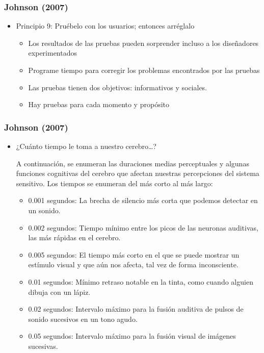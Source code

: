 \documentclass[11pt]{beamer}
\begin{document}
\begin{frame}
\frametitle{Johnson (2007)}
\begin{itemize}
\color{red}
\item Principio 9: Pruébelo con los usuarios; entonces arréglalo
    \par
    \justify
    \color{black}
    \begin{itemize}
    \item Los resultados de las pruebas pueden sorprender incluso a los         diseñadores experimentados 
	\item Programe tiempo para corregir los problemas encontrados por las pruebas
	\item Las pruebas tienen dos objetivos: informativos y sociales.
	\item Hay pruebas para cada momento y propósito
    \end{itemize}
\end{itemize}
\end{frame}

\begin{frame}
\frametitle{Johnson (2007)}
\begin{itemize}
\color{red}
\item ¿Cuánto tiempo le toma a nuestro cerebro…?
\par
\color{black}
A continuación, se enumeran las duraciones medias perceptuales y algunas funciones cognitivas del cerebro que afectan nuestras percepciones del sistema sensitivo. Los tiempos se enumeran del más corto al más largo:
    \par
    \justify
    \color{black}
    \begin{itemize}
    \item 0.001 segundos: La brecha de silencio más corta que podemos detectar en un sonido.
    \item 0.002 segundos: Tiempo mínimo entre los picos de las neuronas auditivas, las más rápidas en el cerebro.
    \item 0.005 segundos: El tiempo más corto en el que se puede mostrar un estímulo visual y que aún nos afecta, tal vez de forma inconsciente.
    \item 0.01 segundos: Mínimo retraso notable en la tinta, como cuando alguien dibuja con un lápiz.
    \item 0.02 segundos: Intervalo máximo para la fusión auditiva de pulsos de sonido sucesivos en un tono agudo.
    \item 0.05 segundos: Intervalo máximo para la fusión visual de imágenes sucesivas.
    \end{itemize}
\end{itemize}
\end{frame}
\end{document}

